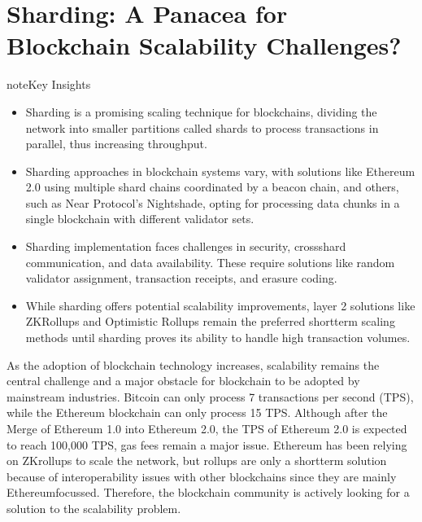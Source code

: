 \documentclass[letterpaper,10pt,english]{jupyterBook}
\begin{document}
\section{Sharding: A Panacea for Blockchain Scalability Challenges?}
\label{\detokenize{SHARDING/sharding:sharding-a-panacea-for-blockchain-scalability-challenges}}\label{\detokenize{SHARDING/sharding::doc}}
\sphinxAtStartPar
{}

\begin{sphinxadmonition}{note}{Key Insights}
\begin{itemize}
\item {} 
\sphinxAtStartPar
Sharding is a promising scaling technique for blockchains, dividing the network into smaller partitions called shards to process transactions in parallel, thus increasing throughput.

\item {} 
\sphinxAtStartPar
Sharding approaches in blockchain systems vary, with solutions like Ethereum 2.0 using multiple shard chains coordinated by a beacon chain, and others, such as Near Protocol’s Nightshade, opting for processing data chunks in a single blockchain with different validator sets.

\item {} 
\sphinxAtStartPar
Sharding implementation faces challenges in security, cross\sphinxhyphen{}shard communication, and data availability. These require solutions like random validator assignment, transaction receipts, and erasure coding.

\item {} 
\sphinxAtStartPar
While sharding offers potential scalability improvements, layer 2 solutions like ZK\sphinxhyphen{}Rollups and Optimistic Rollups remain the preferred short\sphinxhyphen{}term scaling methods until sharding proves its ability to handle high transaction volumes.

\end{itemize}
\end{sphinxadmonition}

\sphinxAtStartPar
As the adoption of blockchain technology increases, scalability remains the central challenge and a major obstacle for blockchain to be adopted by mainstream industries. Bitcoin can only process 7 transactions per second (TPS), while the Ethereum blockchain can only process 15 TPS. Although after the Merge of Ethereum 1.0 into Ethereum 2.0, the TPS of Ethereum 2.0 is expected to reach 100,000 TPS, gas fees remain a major issue. Ethereum has been relying on ZK\sphinxhyphen{}rollups to scale the network, but rollups are only a short\sphinxhyphen{}term solution because of interoperability issues with other blockchains since they are mainly Ethereum\sphinxhyphen{}focussed. Therefore, the blockchain community is actively looking for a solution to the scalability problem.
\end{document}

